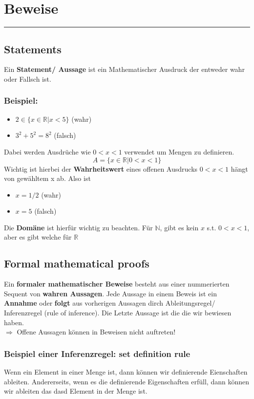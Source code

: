 \section{Beweise}
\rule{\textwidth}{0.4pt}
\subsection{Statements} Ein \textbf{Statement/ Aussage} ist ein Mathematischer Ausdruck der entweder wahr oder Fallsch ist. 
\subsubsection*{Beispiel: } 
\begin{itemize}
    \item $2 \in \{x \in \mathbb{R} \vert x < 5\}$ (wahr)
    \item $3^2 + 5^2 = 8^2$ (falsch)
\end{itemize} 
Dabei werden Ausdrüche wie $0 < x < 1$ verwendet um Mengen zu definieren. \[A = \{x\in\mathbb{R} \vert 0 < x < 1\}\] Wichtig ist hierbei der \textbf{Wahrheitswert} eines offenen Ausdrucks $0 < x < 1$ hängt von gewähltem x ab. Also ist 
\begin{itemize}
    \item $x = 1/2$ (wahr) 
    \item $x = 5 $ (falsch)
\end{itemize}
Die \textbf{Domäne} ist hierfür wichtig zu beachten. Für $\mathbb{N}$, gibt es kein $x$ s.t. $0 < x < 1$, aber es gibt welche für $\mathbb{R}$

\subsection{Formal mathematical proofs} Ein \textbf{formaler mathematischer Beweise} besteht aus einer nummerierten Sequent von \textbf{wahren Aussagen}. Jede Aussage in einem Beweis ist ein \textbf{Annahme} oder \textbf{folgt} aus vorherigen Aussagen dirch Ableitungsregel/ Inferenzregel (rule of inference). Die Letzte Aussage ist die die wir bewiesen haben.\\
$\Rightarrow$ Offene Aussagen können in Beweisen nicht auftreten!

\subsubsection*{Beispiel einer Inferenzregel: set definition rule} Wenn ein Element in einer Menge ist, dann können wir definierende Eienschaften ableiten. Andererseits, wenn es die definierende Eigenschaften erfüll, dann können wir ableiten das dasd Element in der Menge ist.

